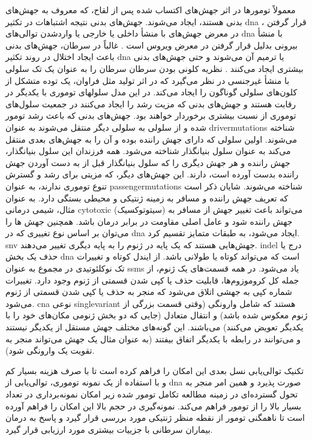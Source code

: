 معمولاً تومورها در اثر جهش‌های اکتساب شده پس از لقاح، که معروف به جهش‌های بدنی هستند، ایجاد می‌شوند. جهش‌های بدنی نتیجه اشتباهات در تکثیر \gls{dna} \cite{behjati2014genome}، قرار گرفتن در معرض جهش‌های با منشأ داخلی یا خارجی یا وارد‌شدن توالی‌های \gls{dna} با منشأ بیرونی بدلیل قرار گرفتن در معرض ویروس است \cite{talbot2004viruses}. غالباً در سرطان، جهش‌های بدنی باعث ایجاد اختلال در روند تکثیر \gls{dna} یا ترمیم آن می‌شوند و حتی جهش‌های بدنی بیشتری ایجاد می‌کنند \cite{stratton2009cancer}. نظریه کلونی بودن سرطان \cite{nowell1976clonal} سرطان را به عنوان یک تک سلولی با منشأ غیرجنسی در نظر می‌گیرد که در اثر تولید مثل فراوان، یک توده متشکل از کلون‌های سلولی گوناگون را ایجاد می‌کند. در این مدل سلولهای توموری با یکدیگر در رقابت هستند و جهش‌های بدنی که مزیت رشد را ایجاد می‌کنند در جمعیت سلول‌های توموری از نسبت بیشتری برخوردار خواهند بود. جهش‌های بدنی که باعث رشد تومور شده و از سلولی به سلولی دیگر منتقل می‌شوند به عنوان \glspl{drivermutation} شناخته می‌شوند. اولین سلولی که دارای جهش راننده بوده و آن را به جهش‌های بعدی منتقل می‌کند به عنوان سلول بنیانگذار شناخته می‌شود. همه فرزندان این سلول بنیانگذار، جهش راننده و هر جهش دیگری را که سلول بنیانگذار قبل از به دست آوردن جهش راننده بدست آورده است، دارند. این جهش‌های دیگر، که مزیتی برای رشد و گسترش تنوع توموری ندارند، به عنوان \glspl{passengermutation} شناخته می‌شوند. شایان ذکر است که تعریف جهش راننده و مسافر به زمینه ژنتیکی و محیطی بستگی دارد. به عنوان مثال، شیمی درمانی \gls{cytotoxic}  (سیتوتوکسیک) می‌تواند باعث تغییر جهش از مسافر به جهش راننده شود و عامل اصلی مقاومت در برابر درمان باشد. همچنین جهش ها را می‌توان بر اساس نوع تغییری که در \gls{dna} ایجاد می‌شود، به طبقات متمایز تقسیم کرد. \gls{snv} جهش‌هایی هستند که یک پایه در ژنوم را به پایه دیگری تغییر می‌دهند. \gls{indel}  درج یا حذف یک بخش \gls{dna} است که می‌تواند کوتاه یا طولانی باشد. از ایندل کوتاه و تغییرات تک نوکلئوتیدی در مجموع به عنوان \glspl{ssm}  یاد می‌شود. در همه قسمت‌های یک ژنوم، از جمله کل کروموزوم‌ها، قابلیت حذف یا کپی شدن قسمتی از ژنوم وجود دارد. تغییرات شماره کپی  به جهشی اتلاق می‌شود که منجر به حذف یا کپی شدن قسمتی از ژنوم می‌شود. \gls{cna} نوعی \gls{singlevariant} هستند که شامل وارونگی (وقتی قسمت بزرگی از ژنوم معکوس شده باشد) و انتقال متعادل (جایی که دو بخش ژنومی مکان‌‌های خود را با یکدیگر تعویض می‌کنند) می‌باشند\cite{stratton2009cancer}. این گونه‌های مختلف جهش مستقل از یکدیگر نیستند و می‌توانند در رابطه با یکدیگر اتفاق بیفتند (به عنوان مثال یک جهش می‌تواند منجر به تقویت یک وارونگی شود). 



تکنیک توالی‌یابی نسل بعدی این امکان را فراهم کرده است تا با صرف هزینه بسیار کم و با استفاده از یک نمونه توموری، توالی‌یابی از \gls{dna} صورت پذیرد و همین امر منجر به تحول گسترده‌ای در زمینه مطالعه تکامل تومور شده زیر امکان نمونه‌برداری در تعداد بسیار بالا را از تومور فراهم می‌کند. نمونه‌گیری در حجم بالا این امکان را فراهم آورده است تا ناهمگنی تومور از نقطه منظر ژنتیکی مورد بررسی قرار گیرد و پاسخ به درمان بیماران سرطانی با جزییات بیشتری مورد ارزیابی قرار گیرد.


